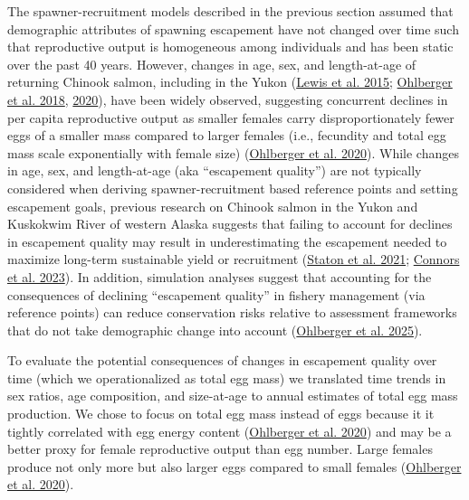 \documentclass[11pt]{book}
\begin{document}
\hypertarget{escapement-quality-1}{%
\label{escapement-quality-1}}

The spawner-recruitment models described in the previous section assumed that demographic attributes of spawning escapement have not changed over time such that reproductive output is homogeneous among individuals and has been static over the past 40 years. However, changes in age, sex, and length-at-age of returning Chinook salmon, including in the Yukon (\protect\hyperlink{ref-lewis_changes_2015}{Lewis et al. 2015}; \protect\hyperlink{ref-ohlberger_demographic_2018}{Ohlberger et al. 2018}, \protect\hyperlink{ref-ohlberger_reproductive_2020}{2020}), have been widely observed, suggesting concurrent declines in per capita reproductive output as smaller females carry disproportionately fewer eggs of a smaller mass compared to larger females (i.e., fecundity and total egg mass scale exponentially with female size) (\protect\hyperlink{ref-ohlberger_reproductive_2020}{Ohlberger et al. 2020}). While changes in age, sex, and length-at-age (aka ``escapement quality'') are not typically considered when deriving spawner-recruitment based reference points and setting escapement goals, previous research on Chinook salmon in the Yukon and Kuskokwim River of western Alaska suggests that failing to account for declines in escapement quality may result in underestimating the escapement needed to maximize long-term sustainable yield or recruitment (\protect\hyperlink{ref-staton_incorporating_2021}{Staton et al. 2021}; \protect\hyperlink{ref-connors_estimates_2023}{Connors et al. 2023}). In addition, simulation analyses suggest that accounting for the consequences of declining ``escapement quality'' in fishery management (via reference points) can reduce conservation risks relative to assessment frameworks that do not take demographic change into account (\protect\hyperlink{ref-ohlberger2025accounting}{Ohlberger et al. 2025}).

To evaluate the potential consequences of changes in escapement quality over time (which we operationalized as total egg mass) we translated time trends in sex ratios, age composition, and size-at-age to annual estimates of total egg mass production. We chose to focus on total egg mass instead of eggs because it it tightly correlated with egg energy content (\protect\hyperlink{ref-ohlberger_reproductive_2020}{Ohlberger et al. 2020}) and may be a better proxy for female reproductive output than egg number. Large females produce not only more but also larger eggs compared to small females (\protect\hyperlink{ref-ohlberger_reproductive_2020}{Ohlberger et al. 2020}).
\end{document}
